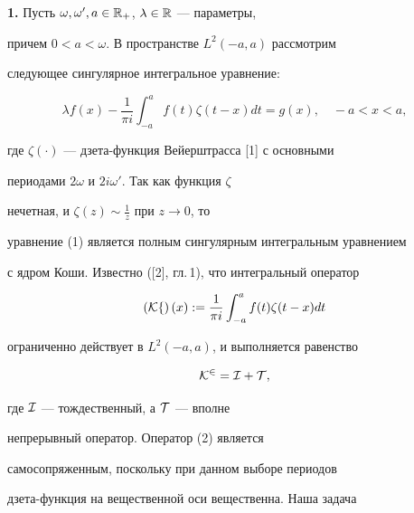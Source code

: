 \label{begin}











{\bf 1.} Пусть $\omega,\omega',a


\in \Bbb{R}_{+}$, $\lambda\in \Bbb{R}$ --- параметры,


причем $0<a<\omega$. В пространстве $L^{2}(-a,a)$ рассмотрим


следующее сингулярное интегральное уравнение:


\begin{equation}


\lambda f(x)-\dfrac{1}{\pi i}\int^{a}_{-a}


f(t)\zeta(t-x)dt=g(x),\quad -a<x<a,


\end{equation}


где $\zeta(\cdot)$ --- дзета-функция Вейерштрасса [1] с основными


периодами $2\omega$ и $2i\omega'$. Так как функция $\zeta$ 


нечетная, и $\zeta(z)\sim\frac{1}{z}$ при $z\rightarrow 0$, то


уравнение (1) является полным сингулярным интегральным  уравнением


с ядром Коши. Известно ([2], гл.\,1), что интегральный оператор


\begin{equation}


\left(\cal{K}f\right)(x):=\dfrac{1}{\pi i}


\int^{a}_{-a}f(t)\zeta(t-x)dt


\end{equation}


ограниченно действует в $L^{2}(-a,a)$, и выполняется равенство


\begin{equation}


\cal{K}^{2}=\cal{I}+\cal{T},


\end{equation}


где $\cal{I}$ --- тождественный, а $\cal{T}$ --- вполне


непрерывный оператор. Оператор (2) является


самосопряженным, поскольку при данном выборе периодов


дзета-функция на вещественной оси вещественна. Наша задача


